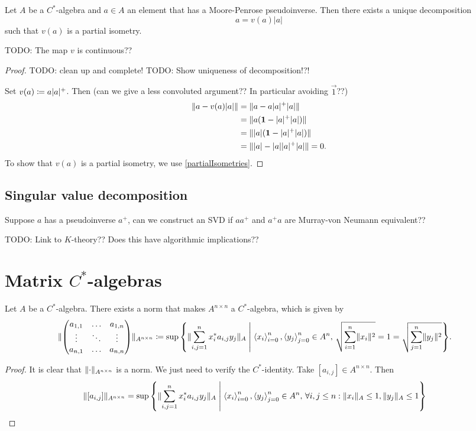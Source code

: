 \begin{proposition}
Let $A$ be a $C^*$-algebra and $a\in A$ an element that has a Moore-Penrose pseudoinverse. Then there exists a unique decomposition
\[ a = v(a)|a| \]
such that $v(a)$ is a partial isometry.
\end{proposition}
TODO: The map $v$ is continuous??
\begin{proof}
TODO: clean up and complete! TODO: Show uniqueness of decomposition!?!

Set $v(a) \coloneqq a|a|^+$. Then (can we give a less convoluted argument?? In particular avoiding $\vec{1}$??)
\begin{align*}
\lVert a - v(a)|a|\rVert &= \lVert a - a|a|^+|a|\rVert \\
&= \lVert a(\boldsymbol{\mathrm{1}} - |a|^+|a|)\rVert \\
&= \lVert|a|(\boldsymbol{\mathrm{1}} - |a|^+|a|)\rVert \\
&= \lVert|a| - |a||a|^+|a|\rVert = 0.
\end{align*}
To show that $v(a)$ is a partial isometry, we use \ref{partialIsometries}.
\end{proof}


\subsection{Singular value decomposition}
Suppose $a$ has a pseudoinverse $a^+$, can we construct an SVD if $aa^+$ and $a^+a$ are Murray-von Neumann equivalent??

TODO: Link to $K$-theory?? Does this have algorithmic implications??

\section{Matrix $C^*$-algebras}
\begin{proposition}
Let $A$ be a $C^*$-algebra. There exists a norm that makes $A^{n\times n}$ a $C^*$-algebra, which is given by
\begin{align*}
\norm{\begin{pmatrix}
a_{1, 1} & \hdots & a_{1,n} \\
\vdots & \ddots & \vdots \\
a_{n,1} & \hdots & a_{n,n}
\end{pmatrix}}_{A^{n\times n}} &\defeq \sup\setbuilder{\norm{\sum_{i,j=1}^nx_i^*a_{i,j}y_{j}}_A}{\seq{x_i}_{i=0}^n, \seq{y_j}_{j=0}^n\in A^n, \, \sqrt{\sum_{i=1}^n \norm{x_i}^2} = 1 = \sqrt{\sum_{j=1}^n \norm{y_j}^2}}.
\end{align*}
\end{proposition}
\begin{proof}
It is clear that $\lVert\cdot\rVert_{A^{n\times n}}$ is a norm. We just need to verify the $C^*$-identity. Take $[a_{i,j}]\in A^{n\times n}$. Then
\begin{align*}
\norm{[a_{i,j}]}_{A^{n\times n}} &= \sup\setbuilder{\norm{\sum_{i,j=1}^nx_i^*a_{i,j}y_{j}}_A}{\seq{x_i}_{i=0}^n, \seq{y_j}_{j=0}^n\in A^n, \,\forall i,j\leq n: \norm{x_i}_{A} \leq 1, \norm{y_j}_{A}\leq 1}
\end{align*}
\end{proof}

